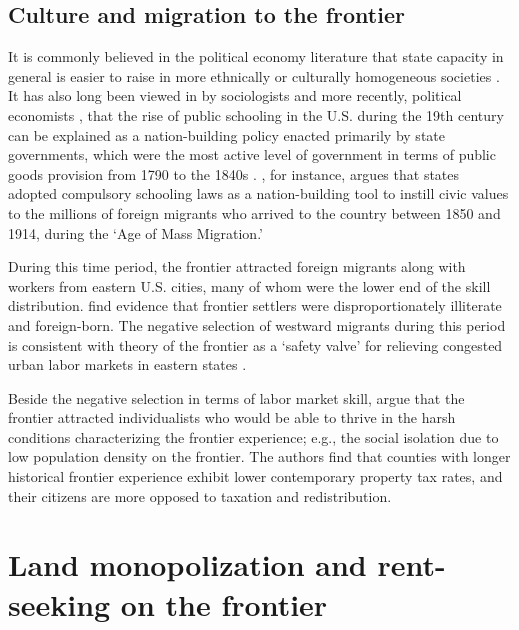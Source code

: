 \subsection{Culture and migration to the frontier}

It is commonly believed in the political economy literature that state capacity in general is easier to raise in more ethnically or culturally homogeneous societies \citep{besley2010state}. It has also long been viewed in by sociologists \citep{meyer1979public} and more recently, political economists \citep{alesina2013nation,bandiera2018nation}, that the rise of public schooling in the U.S. during the 19th century can be explained as a nation-building policy enacted primarily by state governments, which were the most active level of government in terms of public goods provision from 1790 to the 1840s \citep{wallis2000american}. \citet{bandiera2018nation}, for instance, argues that states adopted compulsory schooling laws as a nation-building tool to instill civic values to the millions of foreign migrants who arrived to the country between 1850 and 1914, during the `Age of Mass Migration.' 

During this time period, the frontier attracted foreign migrants along with workers from eastern U.S. cities, many of whom were the lower end of the skill distribution. \citet{bazzi2017frontier} find evidence that frontier settlers were disproportionately illiterate and foreign-born. The negative selection of westward migrants during this period is consistent with theory of the frontier as a `safety valve' for relieving congested urban labor markets in eastern states \citep{turner1956significance, ferrie1997migration}.

Beside the negative selection in terms of labor market skill, \citet{bazzi2017frontier} argue that the frontier attracted individualists who would be able to thrive in the harsh conditions characterizing the frontier experience; e.g., the social isolation due to low population density on the frontier. The authors find that counties with longer historical frontier experience exhibit lower contemporary property tax rates, and their citizens are more opposed to taxation and redistribution. 

\section{Land monopolization and rent-seeking on the frontier} 

